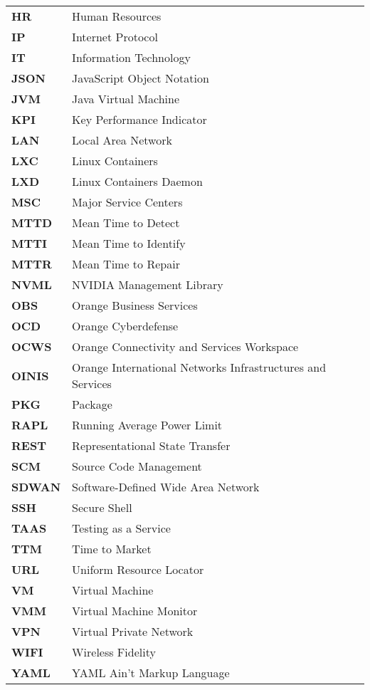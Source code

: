 \begin{tabular}{l l}
    \textbf{HR} & Human Resources \\
    \textbf{IP} & Internet Protocol \\
    \textbf{IT} & Information Technology \\
    \textbf{JSON} & JavaScript Object Notation \\
    \textbf{JVM} & Java Virtual Machine \\
    \textbf{KPI} & Key Performance Indicator \\
    \textbf{LAN} & Local Area Network \\
    \textbf{LXC} & Linux Containers \\
    \textbf{LXD} & Linux Containers Daemon \\
    \textbf{MSC} & Major Service Centers \\
    \textbf{MTTD} & Mean Time to Detect \\
    \textbf{MTTI} & Mean Time to Identify \\
    \textbf{MTTR} & Mean Time to Repair \\
    \textbf{NVML} & NVIDIA Management Library \\
    \textbf{OBS} & Orange Business Services \\
    \textbf{OCD} & Orange Cyberdefense \\
    \textbf{OCWS} & Orange Connectivity and Services Workspace \\
    \textbf{OINIS} & Orange International Networks Infrastructures and Services \\
    \textbf{PKG} & Package \\
    \textbf{RAPL} & Running Average Power Limit \\
    \textbf{REST} & Representational State Transfer \\
    \textbf{SCM} & Source Code Management \\
    \textbf{SDWAN} & Software-Defined Wide Area Network \\
    \textbf{SSH} & Secure Shell \\
    \textbf{TAAS} & Testing as a Service \\
    \textbf{TTM} & Time to Market \\
    \textbf{URL} & Uniform Resource Locator \\
    \textbf{VM} & Virtual Machine \\
    \textbf{VMM} & Virtual Machine Monitor \\
    \textbf{VPN} & Virtual Private Network \\
    \textbf{WIFI} & Wireless Fidelity \\
    \textbf{YAML} & YAML Ain't Markup Language \\
\end{tabular}
